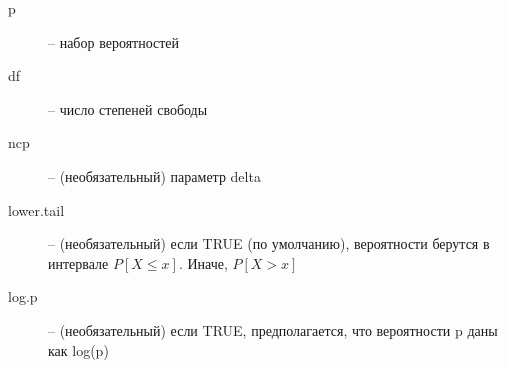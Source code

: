\begin{enumerate}
\begin{mdframed}[style=BadassFrame]
\begin{description}
                \item[p] -- набор вероятностей
                \item[df] -- число степеней свободы
                \item[ncp] -- (необязательный) параметр delta
                \item[lower.tail] -- (необязательный) если TRUE (по умолчанию), вероятности берутся в интервале $P[X \leq x]$. Иначе, $P[X > x]$ 
                \item[log.p] -- (необязательный) если TRUE, предполагается, что вероятности p даны как log(p)
              \end{description}
        \end{mdframed}


\end{enumerate}



